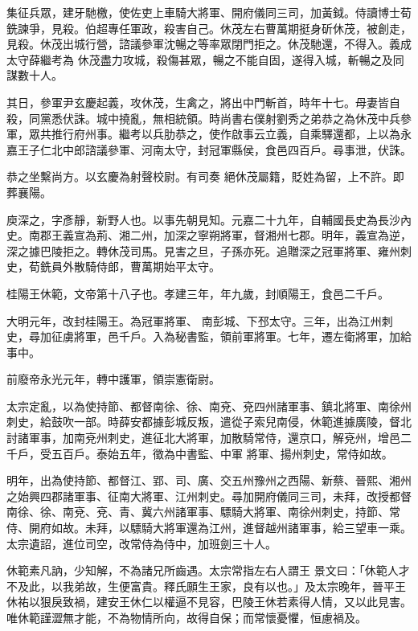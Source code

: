 \begin{pinyinscope}
 集征兵眾，建牙馳檄，使佐吏上車騎大將軍、開府儀同三司，加黃鉞。侍讀博士荀銑諫爭，見殺。伯超專任軍政，殺害自己。休茂左右曹萬期挺身斫休茂，被創走，見殺。休茂出城行營，諮議參軍沈暢之等率眾閉門拒之。休茂馳還，不得入。義成太守薛繼考為
 休茂盡力攻城，殺傷甚眾，暢之不能自固，遂得入城，斬暢之及同謀數十人。



 其日，參軍尹玄慶起義，攻休茂，生禽之，將出中門斬首，時年十七。母妻皆自殺，同黨悉伏誅。城中撓亂，無相統領。時尚書右僕射劉秀之弟恭之為休茂中兵參軍，眾共推行府州事。繼考以兵肋恭之，使作啟事云立義，自乘驛還都，上以為永嘉王子仁北中郎諮議參軍、河南太守，封冠軍縣侯，食邑四百戶。尋事泄，伏誅。



 恭之坐繫尚方。以玄慶為射聲校尉。有司奏
 絕休茂屬籍，貶姓為留，上不許。即葬襄陽。



 庾深之，字彥靜，新野人也。以事先朝見知。元嘉二十九年，自輔國長史為長沙內史。南郡王義宣為荊、湘二州，加深之寧朔將軍，督湘州七郡。明年，義宣為逆，深之據巴陵拒之。轉休茂司馬。見害之旦，子孫亦死。追贈深之冠軍將軍、雍州刺史，荀銑員外散騎侍郎，曹萬期始平太守。



 桂陽王休範，文帝第十八子也。孝建三年，年九歲，封順陽王，食邑二千戶。



 大明元年，改封桂陽王。為冠軍將軍、
 南彭城、下邳太守。三年，出為江州刺史，尋加征虜將軍，邑千戶。入為秘書監，領前軍將軍。七年，遷左衛將軍，加給事中。



 前廢帝永光元年，轉中護軍，領崇憲衛尉。



 太宗定亂，以為使持節、都督南徐、徐、南兗、兗四州諸軍事、鎮北將軍、南徐州刺史，給鼓吹一部。時薛安都據彭城反叛，遣從子索兒南侵，休範進據廣陵，督北討諸軍事，加南兗州刺史，進征北大將軍，加散騎常侍，還京口，解兗州，增邑二千戶，受五百戶。泰始五年，徵為中書監、中軍
 將軍、揚州刺史，常侍如故。



 明年，出為使持節、都督江、郢、司、廣、交五州豫州之西陽、新蔡、晉熙、湘州之始興四郡諸軍事、征南大將軍、江州刺史。尋加開府儀同三司，未拜，改授都督南徐、徐、南兗、兗、青、冀六州諸軍事、驃騎大將軍、南徐州刺史，持節、常侍、開府如故。未拜，以驃騎大將軍還為江州，進督越州諸軍事，給三望車一乘。太宗遺詔，進位司空，改常侍為侍中，加班劍三十人。



 休範素凡訥，少知解，不為諸兄所齒遇。太宗常指左右人謂王
 景文曰：「休範人才不及此，以我弟故，生便富貴。釋氏願生王家，良有以也。」及太宗晚年，晉平王休祐以狠戾致禍，建安王休仁以權逼不見容，巴陵王休若素得人情，又以此見害。唯休範謹澀無才能，不為物情所向，故得自保；而常懷憂懼，恒慮禍及。




\end{pinyinscope}
